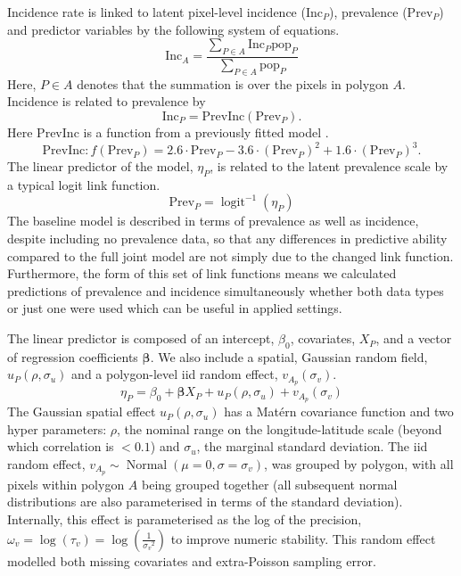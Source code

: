 \documentclass{statsoc}
\begin{document}
Incidence rate is linked to latent pixel-level incidence ($\mathrm{Inc}_P$), prevalence ($\mathrm{Prev}_P$) and predictor variables by the following system of equations.
$$\mathrm{Inc}_A = \frac{ \sum_{P \in A}\mathrm{Inc}_P \mathrm{pop}_P}{\sum_{P \in A}\mathrm{pop}_P} $$
Here, $P \in A$ denotes that the summation is over the pixels in polygon $A$. 
Incidence is related to prevalence by
$$\mathrm{Inc}_P = \mathrm{PrevInc}(\mathrm{Prev}_P).$$
Here $\mathrm{PrevInc}$ is a function from a previously fitted model \citep{cameron2015defining}. 
$$\mathrm{PrevInc}: f\left(\mathrm{Prev}_P\right) = 2.6\cdot\mathrm{Prev}_P - 3.6\cdot{(\mathrm{Prev}_P)}^2 + 1.6\cdot{(\mathrm{Prev}_P)}^3.$$
The linear predictor of the model, $\eta_P$, is related to the latent prevalence scale by a typical logit link function.
$$\mathrm{Prev}_P = \operatorname{logit}^{-1}(\eta_P)$$
The baseline model is described in terms of prevalence as well as incidence, despite including no prevalence data, so that any differences in predictive ability compared to the full joint model are not simply due to the changed link function.
Furthermore, the form of this set of link functions means we calculated predictions of prevalence and incidence simultaneously whether both data types or just one were used which can be useful in applied settings.


The linear predictor is composed of an intercept, $\beta_0$, covariates, $X_P$, and a vector of regression coefficients $\boldsymbol\beta$.
We also include a spatial, Gaussian random field, $u_P(\rho, \sigma_u)$ and a polygon-level iid random effect, $ v_{A_p}(\sigma_v)$.
$$\eta_P = \beta_0 + \boldsymbol\beta X_P  + u_P(\rho, \sigma_u) + v_{A_p}(\sigma_v) $$
The Gaussian spatial effect $u_P(\rho, \sigma_u)$ has a Mat\'ern covariance function and two hyper parameters: $\rho$, the nominal range on the longitude-latitude scale (beyond which correlation is $< 0.1$) and $\sigma_u$, the marginal standard deviation.
The iid random effect, $v_{A_p} \sim \operatorname{Normal}(\mu = 0, \sigma = \sigma_v)$,  was grouped by polygon, with all pixels within polygon $A$ being grouped together (all subsequent normal distributions are also parameterised in terms of the standard deviation).
Internally, this effect is parameterised as the log of the precision, $\omega_v = \log(\tau_v) = \log(\frac{1}{{\sigma_v}^2})$ to improve numeric stability.
This random effect modelled both missing covariates and extra-Poisson sampling error.
\end{document}
